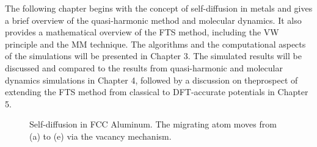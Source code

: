 \documentclass{article}
\begin{document}
The following chapter begins with the concept of self-diffusion in metals and gives a brief overview of the quasi-harmonic method and molecular dynamics. It also provides a mathematical overview of the FTS method, including the VW principle and the MM technique. The algorithms and the computational aspects of the simulations will be presented in Chapter 3. The simulated results will be discussed and compared to the results from quasi-harmonic and molecular dynamics simulations in Chapter 4, followed by a discussion on theprospect of extending the FTS method from classical to DFT-accurate potentials in Chapter 5.

\begin{figure}[!htp]
\centering
{}
\hfill
{}
\caption{Self-diffusion in FCC Aluminum. The migrating atom moves from (a) to (e) via the vacancy mechanism.}
\label{fig:1}
\end{figure}
\end{document}
